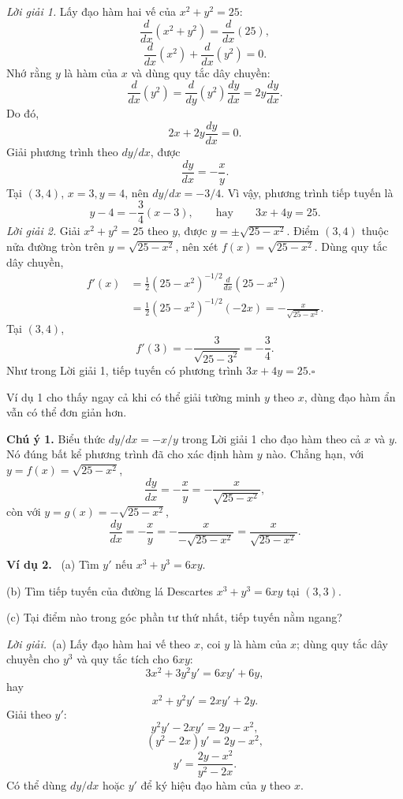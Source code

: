 \documentclass[12pt,a4paper]{article}
\newcommand{\ex}[1]{\par\medskip\noindent\textbf{Ví dụ #1.}\ }
\newcommand{\sol}{\par\nopagebreak[4]\noindent\textit{Lời giải.}\ }
\begin{document}
\noindent\textit{Lời giải 1.} Lấy đạo hàm hai vế của $x^2+y^2=25$:
\[\frac{d}{dx}(x^2+y^2)=\frac{d}{dx}(25),\]
\[\frac{d}{dx}(x^2)+\frac{d}{dx}(y^2)=0.\]
Nhớ rằng $y$ là hàm của $x$ và dùng quy tắc dây chuyền:
\[\frac{d}{dx}(y^2)=\frac{d}{dy}(y^2)\frac{dy}{dx}=2y\frac{dy}{dx}.\]
Do đó,
\[2x+2y\frac{dy}{dx}=0.\]
Giải phương trình theo $dy/dx$, được
\[\frac{dy}{dx}=-\frac xy.\]
Tại $(3,4)$, $x=3,y=4$, nên $dy/dx=-3/4$. Vì vậy, phương trình tiếp tuyến là
\[y-4=-\frac34(x-3),\qquad\text{hay}\qquad3x+4y=25.\]
\noindent\textit{Lời giải 2.} Giải $x^2+y^2=25$ theo $y$, được $y=\pm\sqrt{25-x^2}$. Điểm $(3,4)$ thuộc nửa đường tròn trên $y=\sqrt{25-x^2}$, nên xét $f(x)=\sqrt{25-x^2}$. Dùng quy tắc dây chuyền,
\begin{align*}
f'(x)&=\frac12(25-x^2)^{-1/2}\frac{d}{dx}(25-x^2)\\
&=\frac12(25-x^2)^{-1/2}(-2x)=-\frac{x}{\sqrt{25-x^2}}.
\end{align*}
Tại $(3,4)$,
\[f'(3)=-\frac3{\sqrt{25-3^2}}=-\frac34.\]
Như trong Lời giải 1, tiếp tuyến có phương trình $3x+4y=25$.\hfill$\square$

Ví dụ 1 cho thấy ngay cả khi có thể giải tường minh $y$ theo $x$, dùng đạo hàm ẩn vẫn có thể đơn giản hơn.

\noindent\textbf{Chú ý 1.} Biểu thức $dy/dx=-x/y$ trong Lời giải 1 cho đạo hàm theo cả $x$ và $y$. Nó đúng bất kể phương trình đã cho xác định hàm $y$ nào. Chẳng hạn, với $y=f(x)=\sqrt{25-x^2}$,
\[\frac{dy}{dx}=-\frac xy=-\frac{x}{\sqrt{25-x^2}},\]
còn với $y=g(x)=-\sqrt{25-x^2}$,
\[\frac{dy}{dx}=-\frac xy=-\frac{x}{-\sqrt{25-x^2}}=\frac{x}{\sqrt{25-x^2}}.\]
\ex{2} (a) Tìm $y'$ nếu $x^3+y^3=6xy$.

(b) Tìm tiếp tuyến của đường lá Descartes $x^3+y^3=6xy$ tại $(3,3)$.

(c) Tại điểm nào trong góc phần tư thứ nhất, tiếp tuyến nằm ngang?
\sol (a) Lấy đạo hàm hai vế theo $x$, coi $y$ là hàm của $x$; dùng quy tắc dây chuyền cho $y^3$ và quy tắc tích cho $6xy$:
\[3x^2+3y^2y'=6xy'+6y,\]
hay
\[x^2+y^2y'=2xy'+2y.\]
Giải theo $y'$:
\[y^2y'-2xy'=2y-x^2,\]
\[(y^2-2x)y'=2y-x^2,\]
\[y'=\frac{2y-x^2}{y^2-2x}.\]
Có thể dùng $dy/dx$ hoặc $y'$ để ký hiệu đạo hàm của $y$ theo $x$.
\end{document}

